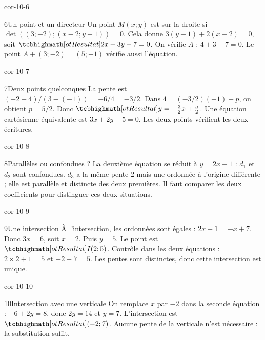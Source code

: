 \begin{blocLivre}{cor-10-6}
\begin{corrige}{6}{Un point et un directeur}
Un point $M(x;y)$ est sur la droite si $\det((3;-2);(x-2;y-1))=0$. Cela donne $3(y-1)+2(x-2)=0$, soit $\res{2x+3y-7=0}$. On vérifie $A$ : $4+3-7=0$. Le point $A+(3;-2)=(5;-1)$ vérifie aussi l’équation.
\label{fig-cor-10-6}
\end{corrige}
\end{blocLivre}
\begin{blocLivre}{cor-10-7}
\begin{corrige}{7}{Deux points quelconques}
La pente est $(-2-4)/(3-(-1))=-6/4=-3/2$. Dans $4=(-3/2)(-1)+p$, on obtient $p=5/2$. Donc $\res{y=-\tfrac32x+\tfrac52}$. Une équation cartésienne équivalente est $3x+2y-5=0$. Les deux points vérifient les deux écritures.
\label{fig-cor-10-7}
\end{corrige}
\end{blocLivre}
\begin{blocLivre}{cor-10-8}
\begin{corrige}{8}{Parallèles ou confondues ?}
La deuxième équation se réduit à $y=2x-1$ : $d_1$ et $d_2$ sont confondues. $d_3$ a la même pente 2 mais une ordonnée à l’origine différente ; elle est parallèle et distincte des deux premières. Il faut comparer les deux coefficients pour distinguer ces deux situations.
\label{fig-cor-10-8}
\end{corrige}
\end{blocLivre}
\begin{blocLivre}{cor-10-9}
\begin{corrige}{9}{Une intersection}
À l’intersection, les ordonnées sont égales : $2x+1=-x+7$. Donc $3x=6$, soit $x=2$. Puis $y=5$. Le point est $\res{I(2;5)}$. Contrôle dans les deux équations : $2\times2+1=5$ et $-2+7=5$. Les pentes sont distinctes, donc cette intersection est unique.
\label{fig-cor-10-9}
\end{corrige}
\end{blocLivre}
\begin{blocLivre}{cor-10-10}
\begin{corrige}{10}{Intersection avec une verticale}
On remplace $x$ par $-2$ dans la seconde équation : $-6+2y=8$, donc $2y=14$ et $y=7$. L’intersection est $\res{(-2;7)}$. Aucune pente de la verticale n’est nécessaire : la substitution suffit.
\label{fig-cor-10-10}
\end{corrige}
\end{blocLivre}
